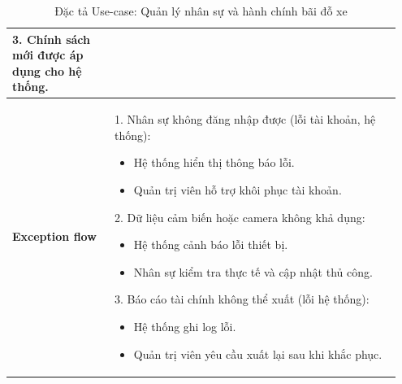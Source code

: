 \documentclass[15pt, a4paper]{article}
\begin{document}
\begin{table}[htpb]
\begin{tabular}{|p{0.25\linewidth}|p{0.7\linewidth}|}
3. Chính sách mới được áp dụng cho hệ thống. \\ \hline
\textbf{Exception flow} & 
1. Nhân sự không đăng nhập được (lỗi tài khoản, hệ thống): 
\begin{itemize}
    \item Hệ thống hiển thị thông báo lỗi.
    \item Quản trị viên hỗ trợ khôi phục tài khoản.
\end{itemize}
2. Dữ liệu cảm biến hoặc camera không khả dụng:
\begin{itemize}
    \item Hệ thống cảnh báo lỗi thiết bị.
    \item Nhân sự kiểm tra thực tế và cập nhật thủ công.
\end{itemize}
3. Báo cáo tài chính không thể xuất (lỗi hệ thống):
\begin{itemize}
    \item Hệ thống ghi log lỗi.
    \item Quản trị viên yêu cầu xuất lại sau khi khắc phục.
\end{itemize}
\\ \hline
\end{tabular}
\caption{Đặc tả Use-case: Quản lý nhân sự và hành chính bãi đỗ xe}
\label{tab:uc_staff_admin}
\end{table}
\end{document}
